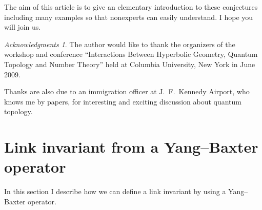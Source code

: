 \documentclass{amsart}
\theoremstyle{definition}
\theoremstyle{remark}
\newtheorem*{ack}{Acknowledgments}
\numberwithin{equation}{section}
\begin{document}
\par
The aim of this article is to give an elementary introduction to these conjectures including many examples so that nonexperts can easily understand.
I hope you will join us.
\begin{ack}
The author would like to thank the organizers of the workshop and conference ``Interactions Between Hyperbolic Geometry, Quantum Topology and Number Theory'' held at Columbia University, New York in June 2009.
\par
Thanks are also due to an immigration officer at J.~F.~Kennedy Airport, who knows me by papers, for interesting and exciting discussion about quantum topology.
\end{ack}
\section{Link invariant from a Yang--Baxter operator}
\label{sec:YB}
In this section I describe how we can define a link invariant by using a Yang--Baxter operator.
\end{document}
